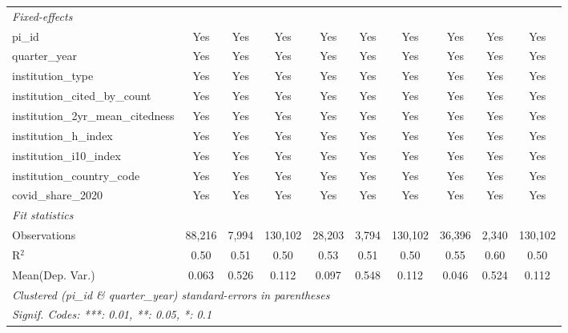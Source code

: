 \begin{tabular}{lccccccccc}
   \midrule
   \emph{Fixed-effects}\\
   pi\_id                                                      & Yes            & Yes            & Yes           & Yes           & Yes            & Yes           & Yes            & Yes           & Yes\\  
   quarter\_year                                               & Yes            & Yes            & Yes           & Yes           & Yes            & Yes           & Yes            & Yes           & Yes\\  
   institution\_type                                           & Yes            & Yes            & Yes           & Yes           & Yes            & Yes           & Yes            & Yes           & Yes\\  
   institution\_cited\_by\_count                               & Yes            & Yes            & Yes           & Yes           & Yes            & Yes           & Yes            & Yes           & Yes\\  
   institution\_2yr\_mean\_citedness                           & Yes            & Yes            & Yes           & Yes           & Yes            & Yes           & Yes            & Yes           & Yes\\  
   institution\_h\_index                                       & Yes            & Yes            & Yes           & Yes           & Yes            & Yes           & Yes            & Yes           & Yes\\  
   institution\_i10\_index                                     & Yes            & Yes            & Yes           & Yes           & Yes            & Yes           & Yes            & Yes           & Yes\\  
   institution\_country\_code                                  & Yes            & Yes            & Yes           & Yes           & Yes            & Yes           & Yes            & Yes           & Yes\\  
   covid\_share\_2020                                          & Yes            & Yes            & Yes           & Yes           & Yes            & Yes           & Yes            & Yes           & Yes\\  
   \midrule
   \emph{Fit statistics}\\
   Observations                                                & 88,216         & 7,994          & 130,102       & 28,203        & 3,794          & 130,102       & 36,396         & 2,340         & 130,102\\  
   R$^2$                                                       & 0.50           & 0.51           & 0.50          & 0.53          & 0.51           & 0.50          & 0.55           & 0.60          & 0.50\\  
Mean(Dep. Var.) & 0.063 & 0.526 & 0.112 & 0.097 & 0.548 & 0.112 & 0.046 & 0.524 & 0.112 \\
   \midrule \midrule
   \multicolumn{10}{l}{\emph{Clustered (pi\_id \& quarter\_year) standard-errors in parentheses}}\\
   \multicolumn{10}{l}{\emph{Signif. Codes: ***: 0.01, **: 0.05, *: 0.1}}\\
\end{tabular}
\par\endgroup

